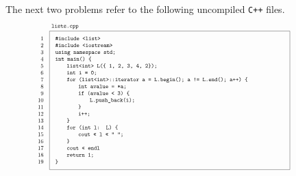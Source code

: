 \documentclass[a4paper,12pt]{article}
\newcommand\indd{${}$\hspace{20pt}}
\begin{document}
\noindent
The next two problems refer to the following uncompiled \texttt{C++} files.
\[
\hspace{-1.5cm}
\scalebox{.6}{
\begin{tikzpicture}
\node[draw,anchor=north,inner sep=10pt] (lists) at (-10,0) {\parbox{14cm}{\raggedright
\texttt{\#include <list>}\linebreak
\texttt{\#include <iostream>}\linebreak
\texttt{using namespace std;}\linebreak
\texttt{int main() \{}\linebreak
\indd\texttt{list<int> L(\{ 1, 2, 3, 4, 2\});}\linebreak
\indd\texttt{int i = 0;}\linebreak
\indd\texttt{for (list<int>::iterator a = L.begin(); a != L.end(); a++) \{}\linebreak
\indd\indd\texttt{int avalue = *a;}\linebreak
\indd\indd\texttt{if (avalue < 3) \{}\linebreak
\indd\indd\indd\texttt{L.push\_back(i);}\linebreak
\indd\indd\texttt{\}}\linebreak
\indd\indd\texttt{i++;}\linebreak
\indd\texttt{\}}\linebreak
\indd\texttt{for (int l: L) \{}\linebreak
\indd\indd\texttt{cout << l << " ";}\linebreak
\indd\texttt{\}}\linebreak
\indd\texttt{cout << endl}\linebreak
\indd\texttt{return 1;}\linebreak
\texttt{\}}
}};
\node[anchor=south west] at (lists.north west) {\texttt{lists.cpp}};
\node[anchor=north,inner sep=10pt,anchor=north east] at (lists.north west) {\parbox{.7cm}{\raggedleft
1\linebreak 2\linebreak 3\linebreak 4\linebreak 5\linebreak 6\linebreak 7\linebreak 8\linebreak 9\linebreak10\linebreak11\linebreak12\linebreak13\linebreak14\linebreak15\linebreak16\linebreak17\linebreak18\linebreak19}};


\end{tikzpicture}}\]
\end{document}
